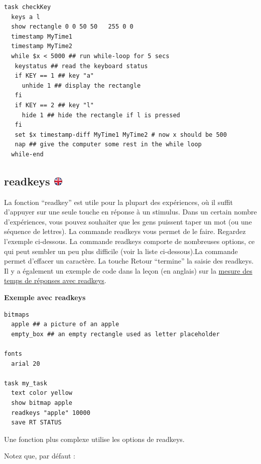 \documentclass[
]{book}
\begin{document}
\begin{verbatim}
task checkKey
  keys a l
  show rectangle 0 0 50 50   255 0 0
  timestamp MyTime1
  timestamp MyTime2
  while $x < 5000 ## run while-loop for 5 secs
   keystatus ## read the keyboard status
   if KEY == 1 ## key "a"
     unhide 1 ## display the rectangle
   fi
   if KEY == 2 ## key "l"
     hide 1 ## hide the rectangle if l is pressed
   fi
   set $x timestamp-diff MyTime1 MyTime2 # now x should be 500
   nap ## give the computer some rest in the while loop
  while-end
\end{verbatim}

\hypertarget{readkeys}{%
\subsection[readkeys ]{\texorpdfstring{readkeys \href{https://www.psytoolkit.org/doc3.4.0/syntax.html\#task-readkeys}{\protect\includegraphics{img/ukflag.png}}}{readkeys }}\label{readkeys}}

La fonction ``readkey'' est utile pour la plupart des expériences, où il suffit d'appuyer sur une seule touche en réponse à un stimulus. Dans un certain nombre d'expériences, vous pouvez souhaiter que les gens puissent taper un mot (ou une séquence de lettres). La commande readkeys vous permet de le faire. Regardez l'exemple ci-dessous. La commande readkeys comporte de nombreuses options, ce qui peut sembler un peu plus difficile (voir la liste ci-dessous).La commande permet d'effacer un caractère. La touche Retour ``termine'' la saisie des readkeys.
Il y a également un exemple de code dans la leçon (en anglais) sur la \href{https://www.psytoolkit.org/lessons/readkeys.html}{mesure des temps de réponses avec readkeys}.

\textbf{Exemple avec readkeys}

\begin{verbatim}
bitmaps
  apple ## a picture of an apple
  empty_box ## an empty rectangle used as letter placeholder

fonts
  arial 20

task my_task
  text color yellow
  show bitmap apple
  readkeys "apple" 10000
  save RT STATUS
\end{verbatim}

Une fonction plus complexe utilise les options de readkeys.

Notez que, par défaut :
\end{document}
